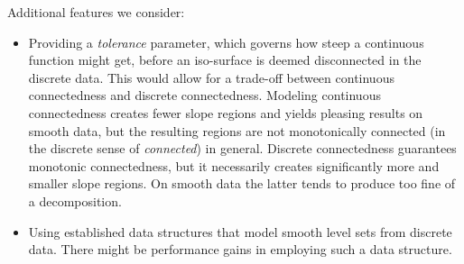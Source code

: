 \documentclass[a4paper,10pt,notitlepage,fullpage]{paper}
\theoremstyle{plain}
\theoremstyle{definition}
\begin{document}
Additional features we consider:
\begin{itemize}
\item Providing a \emph{tolerance} parameter, which governs how steep a continuous function might get, before an iso-surface is deemed disconnected in the discrete data.
This would allow for a trade-off between continuous connectedness and discrete connectedness.
Modeling continuous connectedness creates fewer slope regions and yields pleasing results on smooth data, but the resulting regions are not monotonically connected (in the discrete sense of \emph{connected}) in general.
Discrete connectedness guarantees monotonic connectedness, but it necessarily creates significantly more and smaller slope regions.
On smooth data the latter tends to produce too fine of a decomposition.
\item Using established data structures that model smooth level sets from discrete data. There might be performance gains in employing such a data structure.
\end{itemize}

\end{document}
